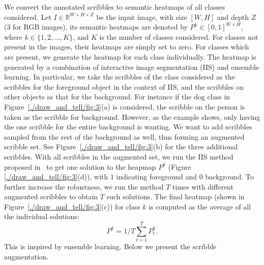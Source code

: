 
We convert the annotated scribbles to semantic heatmaps of all classes
considered.  Let $I \in \mathbb{R}^{W \times H \times Z}$ be the input
image, with size $[W, H]$ and depth $Z$ (3 for RGB images), its
semantic heatmaps are denoted by $P^k \in [0,1]^{W \times H}$, where
$k \in \{1, 2, ...,K \}$, and $K$ is the number of classes
considered. For classes not present in the images, their heatmaps are
simply set to zero.  For classes which are present, we generate the
heatmap for each class individually. The heatmap is generated by a
combination of interactive image segmentation (IIS) and ensemble
learning.  In particular, we take the scribbles of the class
considered as the scribbles for the foreground object in the context
of IIS, and the scribbles on other objects as that for the
background. For instance if the dog class in
Figure~\ref{./draw_and_tell/fig:3}(a) is considered, the scribble on the
person is taken as the scribble for background.  However, as the
example shows, only having the one scribble for the entire background
is wanting.  We want to add scribbles sampled from the rest of the
background as well, thus forming an augmented scribble set. See
Figure~\ref{./draw_and_tell/fig:3}(b) for the three additional
scribbles. With all scribbles in the augmented set, we run the IIS
method proposed in~\citep{geodesic:star} to get one solution to the
heapmap $P^k$ (Figure \ref{./draw_and_tell/fig:3}(d)), with $1$
indicating foreground and $0$ background.
To further increase the robustness, we run the method
$T$ times with different augmented scribbles to obtain $T$ such
solutions. 
The final heatmap (shown in Figure~\ref{./draw_and_tell/fig:3}(c)) for class $k$ is
computed as the average of all the individual solutions:
\begin{equation}
  \label{eq:heatmap}
  P^k = 1/T \sum_{t=1}^T P^k_t.
\end{equation}
This is inspired by ensemble learning. Below we present the scribble augmentation.

